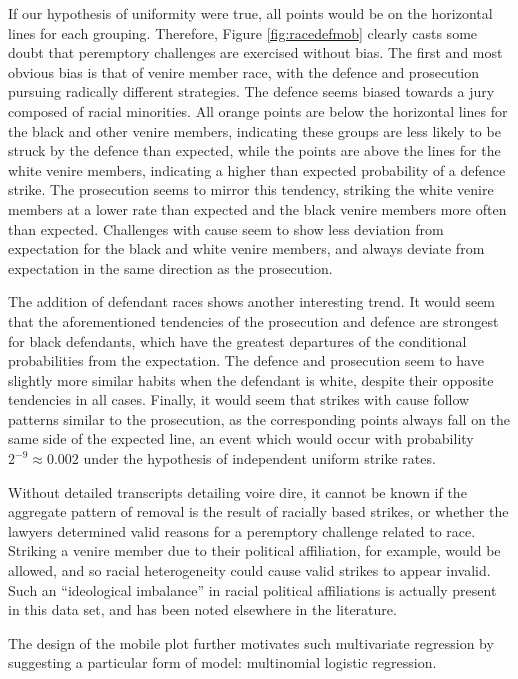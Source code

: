 \documentclass[12pt]{article}
\begin{document}
If our hypothesis of uniformity were true, all points would be on the horizontal lines for each grouping. Therefore, Figure \ref{fig:racedefmob} clearly casts some doubt that peremptory challenges are exercised without bias. The first and most obvious bias is that of venire member race, with the defence and prosecution pursuing radically different strategies. The defence seems biased towards a jury composed of racial minorities. All orange points are below the horizontal lines for the black and other venire members, indicating these groups are less likely to be struck by the defence than expected, while the points are above the lines for the white venire members, indicating a higher than expected probability of a defence strike. The prosecution seems to mirror this tendency, striking the white venire members at a lower rate than expected and the black venire members more often than expected. Challenges with cause seem to show less deviation from expectation for the black and white venire members, and always deviate from expectation in the same direction as the prosecution.

The addition of defendant races shows another interesting trend. It would seem that the aforementioned tendencies of the prosecution and defence are strongest for black defendants, which have the greatest departures of the conditional probabilities from the expectation. The defence and prosecution seem to have slightly more similar habits when the defendant is white, despite their opposite tendencies in all cases. Finally, it would seem that strikes with cause follow patterns similar to the prosecution, as the corresponding points always fall on the same side of the expected line, an event which would occur with probability $2^{-9} \approx 0.002$ under the hypothesis of independent uniform strike rates.

Without detailed transcripts detailing voire dire, it cannot be known if the aggregate pattern of removal is the result of racially based strikes, or whether the lawyers determined valid reasons for a peremptory challenge related to race. Striking a venire member due to their political affiliation, for example, would be allowed, and so racial heterogeneity could cause valid strikes to appear invalid. Such an ``ideological imbalance'' in racial political affiliations is actually present in this data set, and has been noted elsewhere in the literature.

The design of the mobile plot further motivates such multivariate regression by suggesting a particular form of model: multinomial logistic regression.
\end{document}
